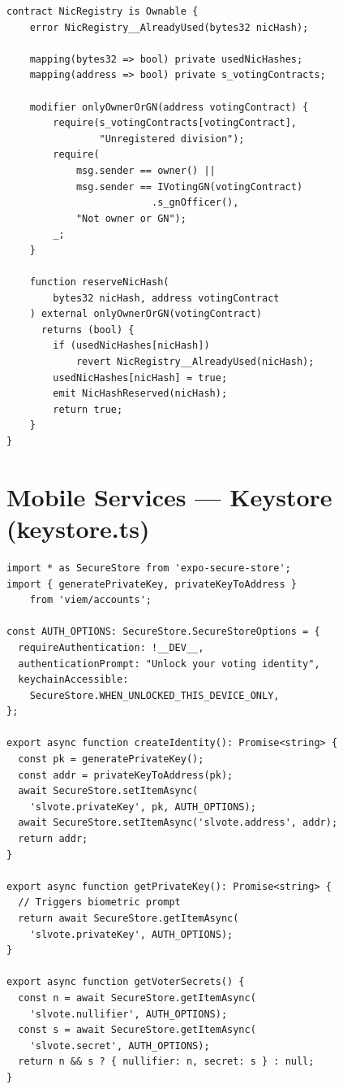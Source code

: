 \begin{lstlisting}[caption={NicRegistry.sol --- Cross-division Sybil prevention}]
contract NicRegistry is Ownable {
    error NicRegistry__AlreadyUsed(bytes32 nicHash);

    mapping(bytes32 => bool) private usedNicHashes;
    mapping(address => bool) private s_votingContracts;

    modifier onlyOwnerOrGN(address votingContract) {
        require(s_votingContracts[votingContract],
                "Unregistered division");
        require(
            msg.sender == owner() ||
            msg.sender == IVotingGN(votingContract)
                         .s_gnOfficer(),
            "Not owner or GN");
        _;
    }

    function reserveNicHash(
        bytes32 nicHash, address votingContract
    ) external onlyOwnerOrGN(votingContract)
      returns (bool) {
        if (usedNicHashes[nicHash])
            revert NicRegistry__AlreadyUsed(nicHash);
        usedNicHashes[nicHash] = true;
        emit NicHashReserved(nicHash);
        return true;
    }
}
\end{lstlisting}

\section{Mobile Services --- Keystore (keystore.ts)}

\begin{lstlisting}[caption={Hardware-backed key storage service}]
import * as SecureStore from 'expo-secure-store';
import { generatePrivateKey, privateKeyToAddress }
    from 'viem/accounts';

const AUTH_OPTIONS: SecureStore.SecureStoreOptions = {
  requireAuthentication: !__DEV__,
  authenticationPrompt: "Unlock your voting identity",
  keychainAccessible:
    SecureStore.WHEN_UNLOCKED_THIS_DEVICE_ONLY,
};

export async function createIdentity(): Promise<string> {
  const pk = generatePrivateKey();
  const addr = privateKeyToAddress(pk);
  await SecureStore.setItemAsync(
    'slvote.privateKey', pk, AUTH_OPTIONS);
  await SecureStore.setItemAsync('slvote.address', addr);
  return addr;
}

export async function getPrivateKey(): Promise<string> {
  // Triggers biometric prompt
  return await SecureStore.getItemAsync(
    'slvote.privateKey', AUTH_OPTIONS);
}

export async function getVoterSecrets() {
  const n = await SecureStore.getItemAsync(
    'slvote.nullifier', AUTH_OPTIONS);
  const s = await SecureStore.getItemAsync(
    'slvote.secret', AUTH_OPTIONS);
  return n && s ? { nullifier: n, secret: s } : null;
}
\end{lstlisting}

